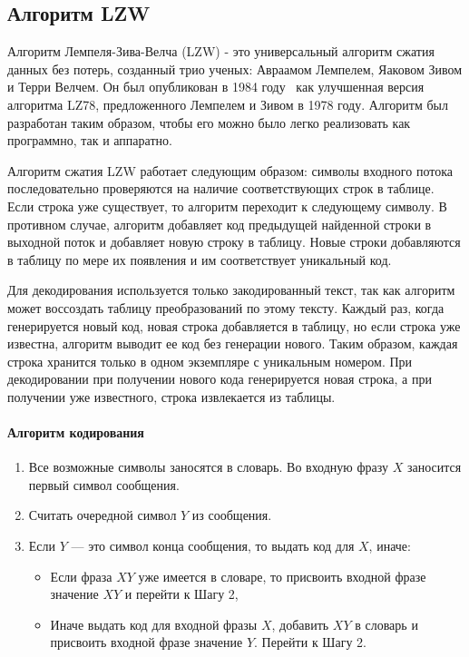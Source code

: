 \documentclass[14pt, russian]{scrartcl}
\begin{document}
\subsection{Алгоритм LZW}
Алгоритм Лемпеля-Зива-Велча (LZW) - это универсальный алгоритм сжатия данных без потерь, созданный трио ученых: Авраамом Лемпелем, Яаковом Зивом и Терри Велчем. Он был опубликован в 1984 году~\cite{lzw} как улучшенная версия алгоритма LZ78, предложенного Лемпелем и Зивом в 1978 году. Алгоритм был разработан таким образом, чтобы его можно было легко реализовать как программно, так и аппаратно.

Алгоритм сжатия LZW работает следующим образом: символы входного потока последовательно проверяются на наличие соответствующих строк в таблице. Если строка уже существует, то алгоритм переходит к следующему символу. В противном случае, алгоритм добавляет код предыдущей найденной строки в выходной поток и добавляет новую строку в таблицу. Новые строки добавляются в таблицу по мере их появления и им соответствует уникальный код.

Для декодирования используется только закодированный текст, так как алгоритм может воссоздать таблицу преобразований по этому тексту. Каждый раз, когда генерируется новый код, новая строка добавляется в таблицу, но если строка уже известна, алгоритм выводит ее код без генерации нового. Таким образом, каждая строка хранится только в одном экземпляре с уникальным номером. При декодировании при получении нового кода генерируется новая строка, а при получении уже известного, строка извлекается из таблицы.

\paragraph* {Алгоритм кодирования}

\begin{enumerate}
\item Все возможные символы заносятся в словарь. Во входную фразу $X$ заносится первый символ сообщения.
\item Считать очередной символ $Y$ из сообщения.
\item Если $Y$ — это символ конца сообщения, то выдать код для $X$, иначе:
    \begin{itemize}
    \item Если фраза $XY$ уже имеется в словаре, то присвоить входной фразе значение $XY$ и перейти к Шагу 2,
    \item Иначе выдать код для входной фразы $X$, добавить $XY$ в словарь и присвоить входной фразе значение $Y$. Перейти к Шагу 2.
    \end{itemize}
\end{enumerate}
\end{document}
